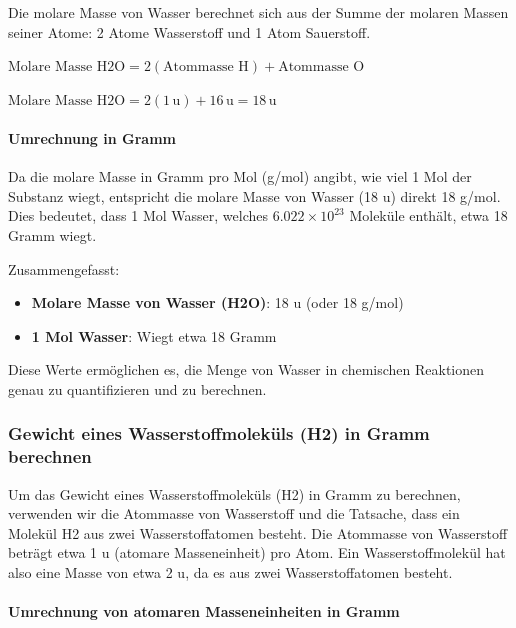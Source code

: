 \documentclass{vorlage-design-main}
\begin{document}
Die molare Masse von Wasser berechnet sich aus der Summe der molaren
Massen seiner Atome: 2 Atome Wasserstoff und 1 Atom Sauerstoff.

$\text{Molare Masse H2O} = 2(\text{Atommasse H}) + \text{Atommasse O}$

$\text{Molare Masse H2O} = 2(1 \, \text{u}) + 16 \, \text{u} = 18 \, \text{u}$

\hypertarget{umrechnung-in-gramm}{%
\paragraph{Umrechnung in Gramm}\label{umrechnung-in-gramm}}

Da die molare Masse in Gramm pro Mol (g/mol) angibt, wie viel 1 Mol der
Substanz wiegt, entspricht die molare Masse von Wasser (18 u) direkt 18
g/mol. Dies bedeutet, dass 1 Mol Wasser, welches
$6.022 \times 10^{23}$ Moleküle enthält, etwa 18 Gramm wiegt.

Zusammengefasst:

\begin{itemize}

\item
  \textbf{Molare Masse von Wasser (H2O)}: 18 u (oder 18 g/mol)
\item
  \textbf{1 Mol Wasser}: Wiegt etwa 18 Gramm
\end{itemize}

Diese Werte ermöglichen es, die Menge von Wasser in chemischen
Reaktionen genau zu quantifizieren und zu berechnen.

\hypertarget{gewicht-eines-wasserstoffmolekuxfcls-h2-in-gramm-berechnen}{%
\subsubsection{Gewicht eines Wasserstoffmoleküls (H2) in Gramm
berechnen}\label{gewicht-eines-wasserstoffmolekuels-h2-in-gramm-berechnen}}

Um das Gewicht eines Wasserstoffmoleküls (H2) in Gramm zu berechnen,
verwenden wir die Atommasse von Wasserstoff und die Tatsache, dass ein
Molekül H2 aus zwei Wasserstoffatomen besteht. Die Atommasse von
Wasserstoff beträgt etwa 1 u (atomare Masseneinheit) pro Atom. Ein
Wasserstoffmolekül hat also eine Masse von etwa 2 u, da es aus zwei
Wasserstoffatomen besteht.

\hypertarget{umrechnung-von-atomaren-masseneinheiten-in-gramm}{%
\paragraph{Umrechnung von atomaren Masseneinheiten in
Gramm}\label{umrechnung-von-atomaren-masseneinheiten-in-gramm}}
\end{document}

